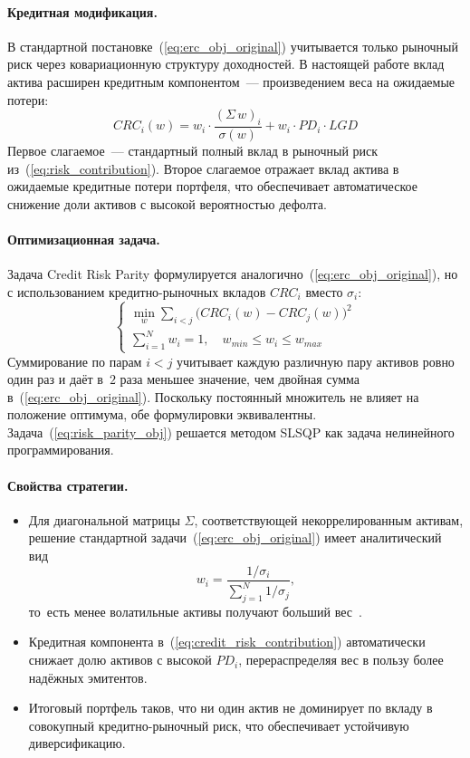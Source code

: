 \documentclass[]{article}
\begin{document}
	\paragraph{Кредитная модификация.}
	В стандартной постановке~(\ref{eq:erc_obj_original}) учитывается только рыночный риск через
	ковариационную структуру доходностей. В настоящей работе вклад актива расширен кредитным
	компонентом~--- произведением веса на ожидаемые потери:
	\begin{equation}
		\label{eq:credit_risk_contribution}
		CRC_i(w) = w_i \cdot \frac{(\Sigma\, w)_i}{\sigma(w)} + w_i \cdot PD_i \cdot LGD
	\end{equation}
	Первое слагаемое~--- стандартный полный вклад в рыночный риск из~(\ref{eq:risk_contribution}).
	Второе слагаемое отражает вклад актива в ожидаемые кредитные потери портфеля, что обеспечивает
	автоматическое снижение доли активов с высокой вероятностью дефолта.

	\paragraph{Оптимизационная задача.}
	Задача Credit Risk Parity формулируется аналогично~(\ref{eq:erc_obj_original}),
	но с использованием кредитно-рыночных вкладов $CRC_i$ вместо $\sigma_i$:
	\begin{equation}
		\label{eq:risk_parity_obj}
		\begin{cases}
			\displaystyle \min_w \sum_{i < j} \bigl( CRC_i(w) - CRC_j(w) \bigr)^2 \\[6pt]
			\sum_{i=1}^N w_i = 1, \quad w_{min} \leq w_i \leq w_{max}
		\end{cases}
	\end{equation}
	Суммирование по парам $i < j$ учитывает каждую различную пару активов ровно один раз и даёт
	в~$2$ раза меньшее значение, чем двойная сумма в~(\ref{eq:erc_obj_original}). Поскольку
	постоянный множитель не влияет на положение оптимума, обе формулировки эквивалентны.
	Задача~(\ref{eq:risk_parity_obj}) решается методом SLSQP как задача нелинейного
	программирования.

	\paragraph{Свойства стратегии.}
	\begin{itemize}
		\item Для диагональной матрицы $\Sigma$, соответствующей некоррелированным активам, решение
		стандартной задачи~(\ref{eq:erc_obj_original}) имеет аналитический вид
		\[
		    w_i = \frac{1/\sigma_i}{\sum_{j=1}^{N} 1/\sigma_j},
		\]
		то~есть менее волатильные активы получают больший вес~\cite{maillard2010}.
		\item Кредитная компонента в~(\ref{eq:credit_risk_contribution}) автоматически снижает
		долю активов с высокой $PD_i$, перераспределяя вес в пользу более надёжных эмитентов.
		\item Итоговый портфель таков, что ни один актив не доминирует по вкладу в совокупный
		кредитно-рыночный риск, что обеспечивает устойчивую диверсификацию.
	\end{itemize}
\end{document}
